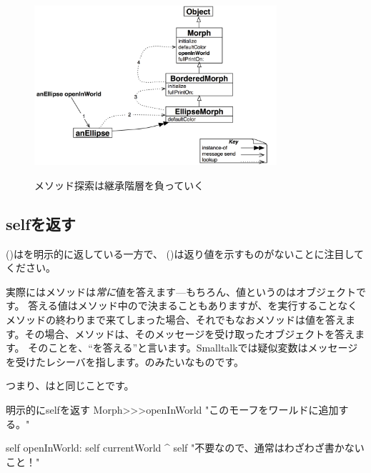 \documentclass[a4paper,10pt,twoside]{book}
\begin{document}
\begin{figure}[htb]
\begin{center}
	{\includegraphics[width=0.8\textwidth]{openInWorldLookup}}
\caption{メソッド探索は継承階層を負っていく}
\end{center}
\end{figure}

\subsection{selfを返す}

 ()はを明示的に返している一方で、 ()は返り値を示すものがないことに注目してください。

実際にはメソッドは\emph{常に}値を答えます---もちろん、値というのはオブジェクトです。
答える値はメソッド中の\ct{^}で決まることもありますが、\ct{^}を実行することなくメソッドの終わりまで来てしまった場合、それでもなおメソッドは値を答えます。その場合、メソッドは、そのメッセージを受け取ったオブジェクトを答えます。
そのことを、``\self を答える''と言います。Smalltalkでは疑似変数\self はメッセージを受けたレシーバを指します。のみたいなものです。

つまり、はと同じことです。

\begin{method}[openInWorldReturnSelf]{明示的にselfを返す}
Morph>>>openInWorld
	"このモーフをワールドに追加する。"
	
    self openInWorld: self currentWorld
	^ self		"不要なので、通常はわざわざ書かないこと！"
\end{method}
\end{document}
